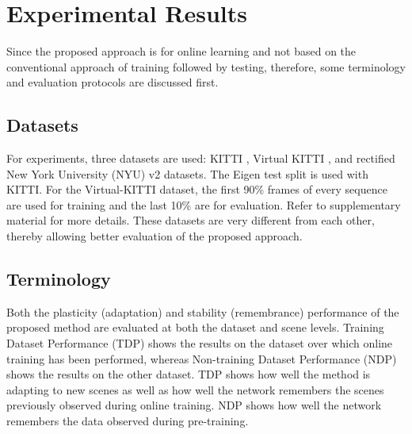 \documentclass[lettersize,journal]{IEEEtran}
\begin{document}
 
 \section{Experimental Results}
 \noindent Since the proposed approach is for online learning and not based on the conventional approach of training followed by testing, therefore, some terminology and evaluation protocols are discussed first.
 
 \subsection{Datasets}
 \noindent For experiments, three datasets are used: KITTI \cite{Menze2015CVPR}, Virtual KITTI \cite{cabon2020vkitti2}, and rectified New York University (NYU) v2 \cite{silberman2012indoor,bian2020unsupervised} datasets. The Eigen test split \cite{eigen2014depth} is used with KITTI. For the Virtual-KITTI dataset, the first 90\% frames of every sequence are used for training and the last 10\% are for evaluation. Refer to supplementary material for more details. These datasets are very different from each other, thereby allowing better evaluation of the proposed approach.
 
 \subsection{Terminology}
 \noindent Both the plasticity (adaptation) and stability (remembrance) performance of the proposed method are evaluated at both the dataset and scene levels. Training Dataset Performance (TDP) shows the results on the dataset over which online training has been performed, whereas Non-training Dataset Performance (NDP) shows the results on the other dataset. TDP shows how well the method is adapting to new scenes as well as how well the network remembers the scenes previously observed during online training. NDP shows how well the network remembers the data observed during pre-training.
 
\end{document}

